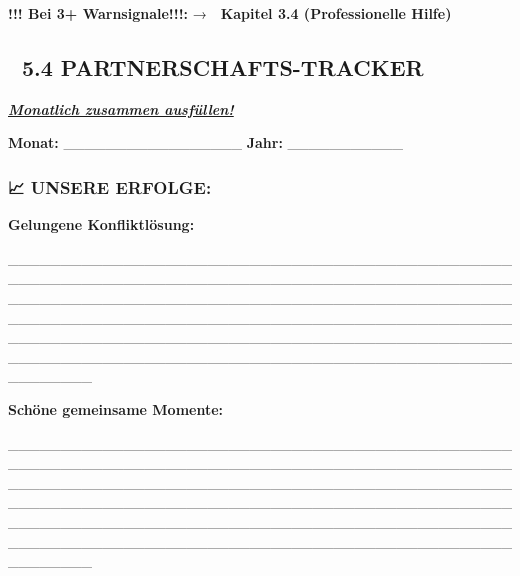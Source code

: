 \textbf{!!! Bei 3+ Warnsignale!!!:} → \textbf{🔴 Kapitel 3.4 (Professionelle Hilfe)}

\hypertarget{partnerschafts-tracker}{%
\subsection{\texorpdfstring{💝 \textbf{5.4 PARTNERSCHAFTS-TRACKER}}{💝 5.4 PARTNERSCHAFTS-TRACKER}}\label{partnerschafts-tracker}}

\emph{\textbf{\ul{Monatlich zusammen ausfüllen!}}}

\textbf{Monat:} \_\_\_\_\_\_\_\_\_\_\_\_\_\_\_\_\_ \textbf{Jahr:} \_\_\_\_\_\_\_\_\_\_\_

\hypertarget{section-10}{%
\subsubsection{}\label{section-10}}

\hypertarget{unsere-erfolge}{%
\subsubsection{\texorpdfstring{\textbf{📈 UNSERE ERFOLGE:}}{📈 UNSERE ERFOLGE:}}\label{unsere-erfolge}}

\textbf{Gelungene Konfliktlösung:}

\_\_\_\_\_\_\_\_\_\_\_\_\_\_\_\_\_\_\_\_\_\_\_\_\_\_\_\_\_\_\_\_\_\_\_\_\_\_\_\_\_\_\_\_\_\_\_\_\_\_\_\_\_\_\_\_\_\_\_\_\_\_\_\_\_\_\_\_\_\_\_\_\_\_\_\_\_\_\_\_\_\_\_\_\_\_\_\_\_\_\_\_\_\_\_\_\_\_\_\_\_\_\_\_\_\_\_\_\_\_\_\_\_\_\_\_\_\_\_\_\_\_\_\_\_\_\_\_\_\_\_\_\_\_\_\_\_\_\_\_\_\_\_\_\_\_\_\_\_\_\_\_\_\_\_\_\_\_\_\_\_\_\_\_\_\_\_\_\_\_\_\_\_\_\_\_\_\_\_\_\_\_\_\_\_\_\_\_\_\_\_\_\_\_\_\_\_\_\_\_\_\_\_\_\_\_\_\_\_\_\_\_\_\_\_\_\_\_\_\_\_\_\_\_\_\_\_\_\_\_\_\_\_\_\_\_\_\_\_\_\_\_\_\_\_\_\_\_\_\_\_\_\_\_\_\_\_\_\_\_\_\_\_\_\_\_\_\_\_\_\_\_\_\_\_\_\_\_\_\_\_\_\_\_\_\_\_\_\_\_\_\_\_\_\_\_

\textbf{Schöne gemeinsame Momente:}

\_\_\_\_\_\_\_\_\_\_\_\_\_\_\_\_\_\_\_\_\_\_\_\_\_\_\_\_\_\_\_\_\_\_\_\_\_\_\_\_\_\_\_\_\_\_\_\_\_\_\_\_\_\_\_\_\_\_\_\_\_\_\_\_\_\_\_\_\_\_\_\_\_\_\_\_\_\_\_\_\_\_\_\_\_\_\_\_\_\_\_\_\_\_\_\_\_\_\_\_\_\_\_\_\_\_\_\_\_\_\_\_\_\_\_\_\_\_\_\_\_\_\_\_\_\_\_\_\_\_\_\_\_\_\_\_\_\_\_\_\_\_\_\_\_\_\_\_\_\_\_\_\_\_\_\_\_\_\_\_\_\_\_\_\_\_\_\_\_\_\_\_\_\_\_\_\_\_\_\_\_\_\_\_\_\_\_\_\_\_\_\_\_\_\_\_\_\_\_\_\_\_\_\_\_\_\_\_\_\_\_\_\_\_\_\_\_\_\_\_\_\_\_\_\_\_\_\_\_\_\_\_\_\_\_\_\_\_\_\_\_\_\_\_\_\_\_\_\_\_\_\_\_\_\_\_\_\_\_\_\_\_\_\_\_\_\_\_\_\_\_\_\_\_\_\_\_\_\_\_\_\_\_\_\_\_\_\_\_\_\_\_\_\_\_\_

